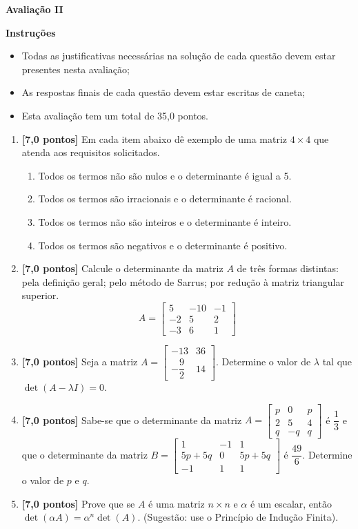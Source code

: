 \documentclass[12pt,a4paper]{article}
\begin{document}
\begin{center}
 \textbf{Avaliação II}
\end{center}

\textbf{Instruções}
\begin{itemize}
 \item Todas as justificativas necessárias na solução de cada questão devem estar presentes nesta avaliação;
 \item As respostas finais de cada questão devem estar escritas de caneta;
 \item Esta avaliação tem um total de 35,0 pontos.
\end{itemize}

\begin{enumerate}
  \item \textbf{[7,0 pontos]} Em cada item abaixo dê exemplo de uma matriz $4\times 4$ que atenda aos requisitos solicitados.
    \begin{enumerate}
      \item Todos os termos não são nulos e o determinante é igual a 5.
      \item Todos os termos são irracionais e o determinante é racional.
      \item Todos os termos não são inteiros e o determinante é inteiro.
      \item Todos os termos são negativos e o determinante é positivo.
    \end{enumerate}

  \item \textbf{[7,0 pontos]} Calcule o determinante da matriz $A$ de três formas distintas: pela
    definição geral; pelo método de Sarrus; por redução à matriz triangular
    superior. 
    $$A=\begin{bmatrix}
      5 & -10 & -1\\
      -2 & 5 & 2\\
      -3 & 6 & 1
    \end{bmatrix}$$

  \item \textbf{[7,0 pontos]} Seja a matriz
    $A=\begin{bmatrix} -13 & 36 \\ -\dfrac{9}{2} & 14 \end{bmatrix}$.
    Determine o valor de $\lambda$ tal que $\det(A-\lambda I) = 0$.

  \item \textbf{[7,0 pontos]} Sabe-se que o determinante da matriz
    $A=\begin{bmatrix}
      p & 0 & p\\
      2 & 5 & 4\\
      q & -q & q
    \end{bmatrix}$ é $\dfrac{1}{3}$ e que o determinante da matriz
    $B=\begin{bmatrix}
      1 & -1 & 1 \\
      5p + 5q & 0 & 5p + 5q \\
      -1 & 1 & 1
    \end{bmatrix}$
    é $\dfrac{49}{6}$. Determine o valor de $p$ e $q$.
    
  \item \textbf{[7,0 pontos]} Prove que se $A$ é uma matriz $n\times n$ e $\alpha$
    é um escalar, então $\det(\alpha A) = \alpha^n\det(A)$.
    (Sugestão: use o Princípio de Indução Finita).
  
  \end{enumerate}
\end{document}
